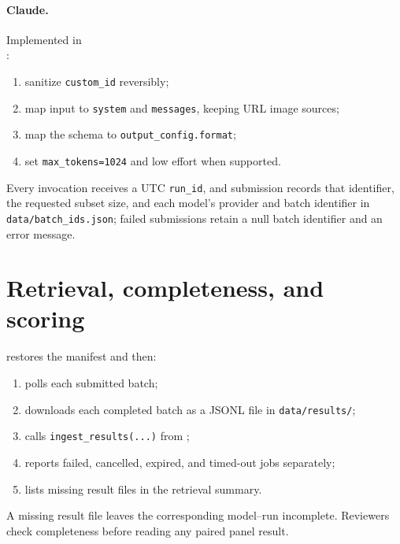 \paragraph{Claude.}
Implemented in\\
\mbox{}:
\begin{enumerate}
    \item sanitize \texttt{custom\_id} reversibly;
    \item map input to \texttt{system} and \texttt{messages}, keeping URL image sources;
    \item map the schema to \texttt{output\_config.format};
    \item set \texttt{max\_tokens=1024} and low effort when supported.
\end{enumerate}

Every invocation receives a UTC \texttt{run\_id}, and submission records that
identifier, the requested subset size, and each model's provider and batch
identifier in \texttt{data/batch\_ids.json}; failed submissions retain a null
batch identifier and an error message.

\section{Retrieval, completeness, and scoring}
\label{sec:metrics-dashboard}
\mbox{}
restores the manifest and then:
\begin{enumerate}
    \item polls each submitted batch;
    \item downloads each completed batch as a JSONL file in \texttt{data/results/};
    \item calls \texttt{ingest\_results(...)} from \mbox{};
    \item reports failed, cancelled, expired, and timed-out jobs separately;
    \item lists missing result files in the retrieval summary.
\end{enumerate}
A missing result file leaves the corresponding model--run incomplete.
Reviewers check completeness before reading any paired panel result.

